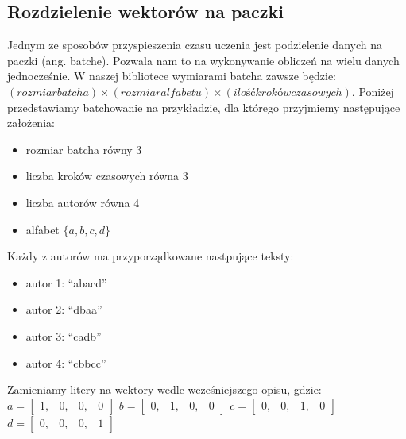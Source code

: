 \subsection{Rozdzielenie wektorów na paczki}
Jednym ze sposobów przyspieszenia czasu uczenia jest podzielenie danych na paczki (ang. batche).
Pozwala nam to na wykonywanie obliczeń na wielu danych jednocześnie. W naszej bibliotece 
wymiarami batcha zawsze będzie: $(rozmiar batcha) \times (rozmiar alfabetu) \times (ilość kroków czasowych)$. 
Poniżej przedstawiamy batchowanie na przykładzie, dla którego przyjmiemy następujące założenia: 
\begin{itemize}
	\item rozmiar batcha równy 3
	\item liczba kroków czasowych równa 3
	\item liczba autorów równa 4
	\item alfabet $\{a,b,c,d\}$
\end{itemize}

Każdy z autorów ma przyporządkowane nastpujące teksty:
\begin{itemize}
	\item autor 1: ``abacd''
	\item autor 2: ``dbaa''
	\item autor 3: ``cadb''
	\item autor 4: ``cbbcc''
\end{itemize}

Zamieniamy litery na wektory wedle wcześniejszego opisu, gdzie:
\vspace{3mm}
\newline 
$
a =
\begin{bmatrix} 
1, & 0, & 0, & 0
\end{bmatrix} 
$
\vspace{3mm}
\newline
$
b = 
\begin{bmatrix} 
0, & 1, & 0, & 0
\end{bmatrix} 
$
\vspace{3mm}
\newline 
$
c =
\begin{bmatrix} 
0, & 0, & 1, & 0
\end{bmatrix} 
$
\vspace{3mm}
\newline 
$
d =
\begin{bmatrix} 
0, & 0, & 0, & 1
\end{bmatrix} 
$
\vspace{1mm}
\newline 

